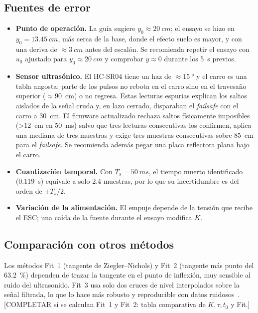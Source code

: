 \documentclass[conference,10pt]{IEEEtran}
\begin{document}
\subsection{Fuentes de error}
\begin{itemize}
\item \textbf{Punto de operación.} La guía sugiere $y_0\approx\SI{20}{cm}$; el ensayo se hizo en $y_0=\SI{13.45}{cm}$, más cerca de la base, donde el efecto suelo es mayor, y con una deriva de $\approx\SI{3}{cm}$ antes del escalón. Se recomienda repetir el ensayo con $u_0$ ajustado para $y_0\approx\SI{20}{cm}$ y comprobar $\dot y\approx 0$ durante los \SI{5}{s} previos.
\item \textbf{Sensor ultrasónico.} El HC-SR04 tiene un haz de $\approx\SI{15}{\degree}$ y el carro es una tabla angosta: parte de los pulsos no rebota en el carro sino en el travesaño superior ($\approx$\SI{90}{cm}) o no regresa. Estas lecturas espurias explican los saltos aislados de la señal cruda y, en lazo cerrado, disparaban el \textit{failsafe} con el carro a \SI{30}{cm}. El firmware actualizado rechaza saltos físicamente imposibles (\SI{>12}{cm} en \SI{50}{ms}) salvo que tres lecturas consecutivas los confirmen, aplica una mediana de tres muestras y exige tres muestras consecutivas sobre \SI{85}{cm} para el \textit{failsafe}. Se recomienda además pegar una placa reflectora plana bajo el carro.
\item \textbf{Cuantización temporal.} Con $T_s=\SI{50}{ms}$, el tiempo muerto identificado (\SI{0.119}{s}) equivale a solo 2.4 muestras, por lo que su incertidumbre es del orden de $\pm T_s/2$.
\item \textbf{Variación de la alimentación.} El empuje depende de la tensión que recibe el ESC; una caída de la fuente durante el ensayo modifica $K$.
\end{itemize}

\subsection{Comparación con otros métodos}
Los métodos Fit~1 (tangente de Ziegler--Nichols) y Fit~2 (tangente más punto del \SI{63.2}{\percent}) dependen de trazar la tangente en el punto de inflexión, muy sensible al ruido del ultrasonido. Fit~3 usa solo dos cruces de nivel interpolados sobre la señal filtrada, lo que lo hace más robusto y reproducible con datos ruidosos~\cite{smith}. [COMPLETAR si se calculan Fit~1 y Fit~2: tabla comparativa de $K,\tau,t_0$ y Fit.]
\end{document}
